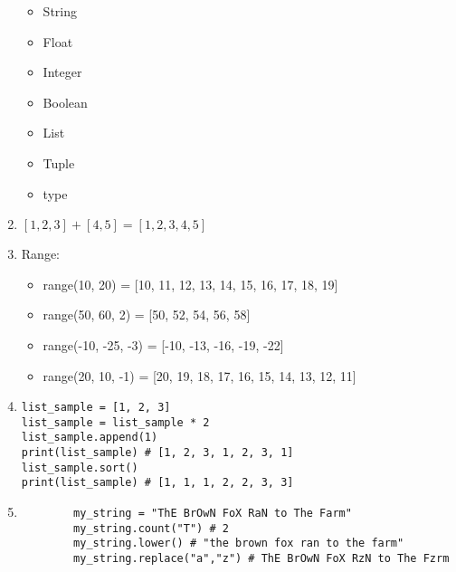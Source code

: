 \documentclass{article}
\begin{document}
\begin{enumerate}
        \begin{itemize}
            \item String
            \item Float
            \item Integer
            \item Boolean
            \item List
            \item Tuple
            \item type
        \end{itemize}
        \item $[1, 2, 3] + [4, 5] = [1, 2, 3, 4, 5]$
        \item Range:
        \begin{itemize}
            \item range(10, 20) = [10, 11, 12, 13, 14, 15, 16, 17, 18, 19]
            \item range(50, 60, 2) = [50, 52, 54, 56, 58]
            \item range(-10, -25, -3) = [-10, -13, -16, -19, -22]
            \item range(20, 10, -1) = [20, 19, 18, 17, 16, 15, 14, 13, 12, 11]
        \end{itemize}
        \item 
\begin{verbatim}
list_sample = [1, 2, 3]
list_sample = list_sample * 2
list_sample.append(1)
print(list_sample) # [1, 2, 3, 1, 2, 3, 1]
list_sample.sort()
print(list_sample) # [1, 1, 1, 2, 2, 3, 3]
\end{verbatim}
    \item \begin{verbatim}
        my_string = "ThE BrOwN FoX RaN to The Farm"
        my_string.count("T") # 2
        my_string.lower() # "the brown fox ran to the farm"
        my_string.replace("a","z") # ThE BrOwN FoX RzN to The Fzrm
    \end{verbatim}
    \end{enumerate}
\end{document}
